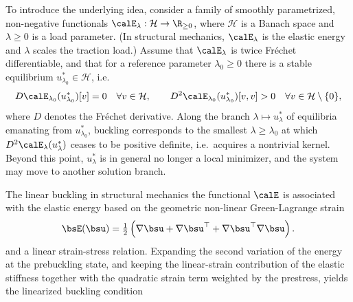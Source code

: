 To introduce the underlying idea, consider a family of smoothly parametrized, non-negative functionals $\calE_\lambda : \mathcal{H} \to \R_{\geq 0}$, where $\mathcal{H}$ is a Banach space and $\lambda \geq 0$ is a load parameter. (In structural mechanics, $\calE_\lambda$ is the elastic energy and $\lambda$ scales the traction load.) Assume that $\calE_\lambda$ is twice Fr\'echet differentiable, and that for a reference parameter $\lambda_0 \geq 0$ there is a stable equilibrium $u^*_{\lambda_0} \in \mathcal{H}$, i.e.
\begin{align*}
    D\calE_{\lambda_0}(u^*_{\lambda_0})[v] = 0 \quad \forall v \in \mathcal{H},
    \qquad
    D^2 \calE_{\lambda_0}(u^*_{\lambda_0})[v,v] > 0 \quad \forall v \in \mathcal{H}\setminus\{0\},
\end{align*}
where $D$ denotes the Fr\'echet derivative.
Along the branch $\lambda \mapsto u^*_\lambda$ of equilibria emanating from $u^*_{\lambda_0}$, buckling corresponds to the smallest $\lambda \geq \lambda_0$ at which $D^2\calE_\lambda(u^*_\lambda)$ ceases to be positive definite, i.e.\ acquires a nontrivial kernel. Beyond this point, $u^*_\lambda$ is in general no longer a local minimizer, and the system may move to another solution branch.

The linear buckling in structural mechanics the functional $\calE$ is associated with the elastic energy based on the geometric non-linear Green-Lagrange strain
\begin{align*}
    \bsE(\bsu) = \tfrac12 \left( \nabla \bsu + \nabla \bsu^\top + \nabla \bsu^\top \nabla \bsu \right).
\end{align*}
and a linear strain-stress relation. 
Expanding the second variation of the energy at the prebuckling state, and keeping the linear-strain contribution of the elastic stiffness together with the quadratic strain term weighted by the prestress, yields the linearized buckling condition


